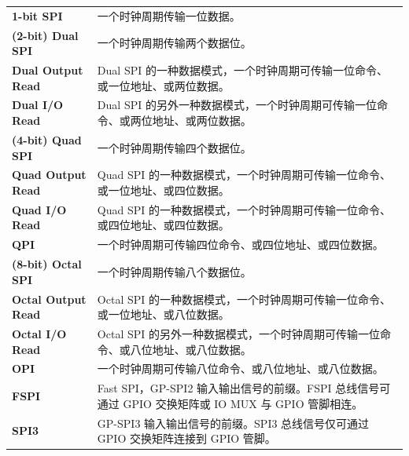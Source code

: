 \begin{longtable}[c]{ R{4cm} p{10cm} }
\textbf{1-bit SPI} & 一个时钟周期传输一位数据。\\ 
\textbf{(2-bit) Dual SPI} & 一个时钟周期传输两个数据位。\\
\textbf{Dual Output Read} & Dual SPI 的一种数据模式，一个时钟周期可传输一位命令、或一位地址、或两位数据。\\
\textbf{Dual I/O Read} & Dual SPI 的另外一种数据模式，一个时钟周期可传输一位命令、或两位地址、或两位数据。\\
\textbf{(4-bit) Quad SPI} & 一个时钟周期传输四个数据位。\\
\textbf{Quad Output Read} & Quad SPI 的一种数据模式，一个时钟周期可传输一位命令、或一位地址、或四位数据。\\
\textbf{Quad I/O Read} & Quad SPI 的一种数据模式，一个时钟周期可传输一位命令、或四位地址、或四位数据。\\
\textbf{QPI} & 一个时钟周期可传输四位命令、或四位地址、或四位数据。\\
\textbf{(8-bit) Octal SPI} & 一个时钟周期传输八个数据位。 \\
\textbf{Octal Output Read} & Octal SPI 的一种数据模式，一个时钟周期可传输一位命令、或一位地址、或八位数据。\\
\textbf{Octal I/O Read} & Octal SPI 的另外一种数据模式，一个时钟周期可传输一位命令、或八位地址、或八位数据。\\
\textbf{OPI} & 一个时钟周期可传输八位命令、或八位地址、或八位数据。\\
\textbf{FSPI} & Fast SPI，GP-SPI2 输入输出信号的前缀。FSPI 总线信号可通过 GPIO 交换矩阵或 IO MUX 与 GPIO 管脚相连。\\
\textbf{SPI3} & GP-SPI3 输入输出信号的前缀。SPI3 总线信号仅可通过 GPIO 交换矩阵连接到 GPIO 管脚。
\end{longtable}
